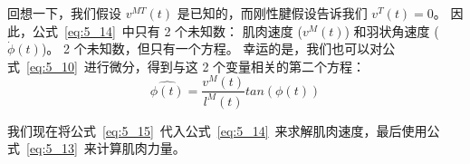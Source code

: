 回想一下，我们假设 $v^{MT}(t)$ 是已知的，而刚性腱假设告诉我们 $v^T(t) = 0$。
因此，公式~\ref{eq:5_14}~中只有 2 个未知数：
肌肉速度 ($v^M(t)$) 和羽状角速度 ($\dot{\phi} (t)$)。
2 个未知数，但只有一个方程。
幸运的是，我们也可以对公式~\ref{eq:5_10}~进行微分，得到与这 2 个变量相关的第二个方程：
%
\begin{equation}
	\hat{\phi (t)} = \frac{v^M (t)}{l^M (t)} tan(\phi (t))
	\label{eq:5_15}
\end{equation}


我们现在将公式~\ref{eq:5_15}~代入公式~\ref{eq:5_14}~来求解肌肉速度，最后使用公式~\ref{eq:5_13}~来计算肌肉力量。




